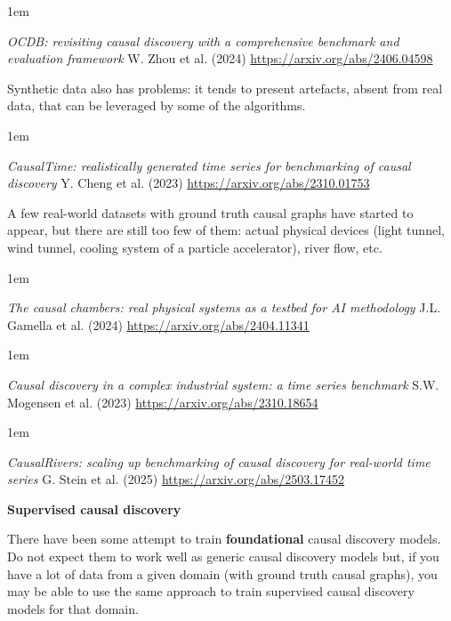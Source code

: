 \documentclass[a5paper]{article}
\let\d\textbf
\newenvironment{reference}{%
  \medskip\goodbreak
  \parskip 0pt
  \raggedright
  \leftskip 1em
  \obeylines
}{\par\medskip\goodbreak}
\def\subsection#1{{\par\bigskip\goodbreak\large\bfseries #1\par}}
\begin{document}
\begin{reference}
  \emph{OCDB: revisiting causal discovery  with a comprehensive benchmark  and evaluation framework}
  W. Zhou et al. (2024)
  \url{https://arxiv.org/abs/2406.04598}
\end{reference}

Synthetic data also has problems: it tends to present artefacts, absent from real data,
that can be leveraged by some of the algorithms.

\begin{reference}
  \emph{CausalTime: realistically generated time series for benchmarking of causal discovery}
  Y. Cheng et al. (2023)
  \url{https://arxiv.org/abs/2310.01753}
\end{reference}

A few real-world datasets with ground truth causal graphs have started to appear,
but there are still too few of them:
actual physical devices (light tunnel, wind tunnel,
cooling system of a particle accelerator), river flow, etc.

\begin{reference}
  \emph{The causal chambers: real physical systems  as a testbed for AI methodology}
  J.L. Gamella et al. (2024)
  \url{https://arxiv.org/abs/2404.11341}
\end{reference}

\begin{reference}
  \emph{Causal discovery in a complex industrial system: a time series benchmark}
  S.W. Mogensen et al. (2023)
  \url{https://arxiv.org/abs/2310.18654}
\end{reference}

\begin{reference}
  \emph{CausalRivers: scaling up benchmarking of causal discovery for real-world time series}
  G. Stein et al. (2025)
  \url{https://arxiv.org/abs/2503.17452}
\end{reference}

\subsection{Supervised causal discovery}

There have been some attempt to train \d{foundational} causal discovery models.
Do not expect them to work well as generic causal discovery models but,
if you have a lot of data from a given domain (with ground truth causal graphs),
you may be able to use the same approach to train supervised causal discovery models
for that domain.
\end{document}
